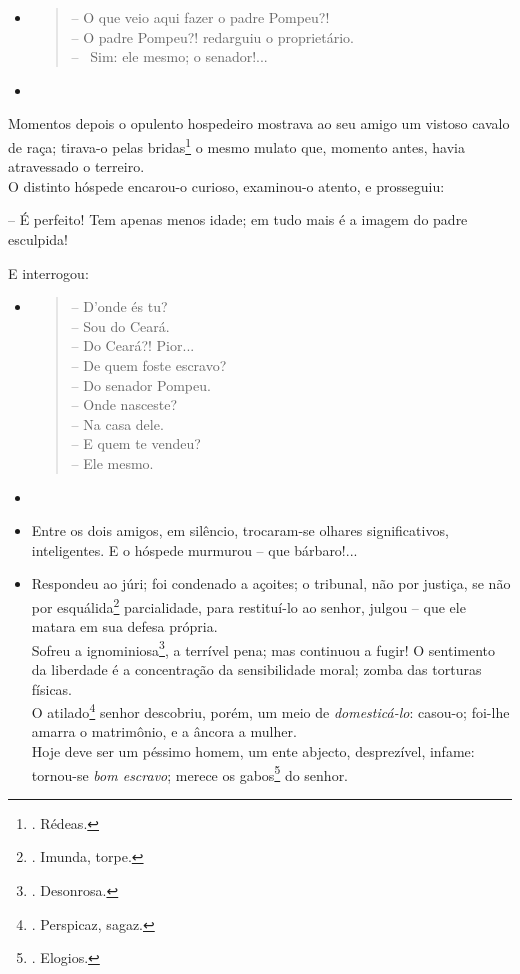\begin{itemize}
\item
  \begin{quote}
  -- O que veio aqui fazer o padre Pompeu?!\\
  -- O padre Pompeu?! redarguiu o proprietário.\\
  -- ~Sim: ele mesmo; o senador!...
  \end{quote}
\item
\end{itemize}

Momentos depois o opulento hospedeiro mostrava ao seu amigo um vistoso
cavalo de raça; tirava-o pelas bridas\footnote{. Rédeas.} o mesmo mulato
que, momento antes, havia atravessado o terreiro.\\
O distinto hóspede encarou-o curioso, examinou-o atento, e prosseguiu:

-- É perfeito! Tem apenas menos idade; em tudo mais é a imagem do padre
esculpida!

E interrogou:

\begin{itemize}
\item
  \begin{quote}
  -- D'onde és tu?\\
  -- Sou do Ceará.\\
  -- Do Ceará?! Pior...\\
  -- De quem foste escravo?\\
  -- Do senador Pompeu.\\
  -- Onde nasceste?\\
  -- Na casa dele.\\
  -- E quem te vendeu?\\
  -- Ele mesmo.
  \end{quote}
\item
\item
  Entre os dois amigos, em silêncio, trocaram-se olhares significativos,
  inteligentes. E o hóspede murmurou -- que bárbaro!...
\item
  Respondeu ao júri; foi condenado a açoites; o tribunal, não por
  justiça, se não por esquálida\footnote{. Imunda, torpe.} parcialidade,
  para restituí-lo ao senhor, julgou -- que ele matara em sua defesa
  própria.\\
  Sofreu a ignominiosa\footnote{. Desonrosa.}, a terrível pena; mas
  continuou a fugir! O sentimento da liberdade é a concentração da
  sensibilidade moral; zomba das torturas físicas.\\
  O atilado\footnote{. Perspicaz, sagaz.} senhor descobriu, porém, um
  meio de \emph{domesticá-lo}: casou-o; foi-lhe amarra o matrimônio, e a
  âncora a mulher.\\
  Hoje deve ser um péssimo homem, um ente abjecto, desprezível, infame:
  tornou-se \emph{bom escravo}; merece os gabos\footnote{. Elogios.} do
  senhor.
\end{itemize}

